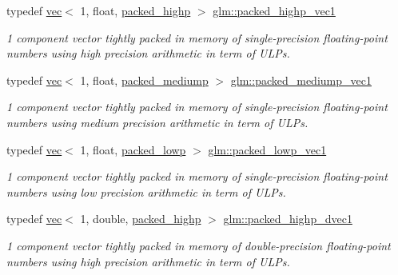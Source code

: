 \begin{DoxyCompactItemize}
typedef \hyperlink{structglm_1_1vec}{vec}$<$ 1, float, \hyperlink{namespaceglm_a36ed105b07c7746804d7fdc7cc90ff25a8e8791ee77fe079b1291f710d88031bf}{packed\+\_\+highp} $>$ \hyperlink{group__gtc__type__aligned_ga0356e10a8b10f699cf7cf4308f449c83}{glm\+::packed\+\_\+highp\+\_\+vec1}
\begin{DoxyCompactList}\small\item\em 1 component vector tightly packed in memory of single-\/precision floating-\/point numbers using high precision arithmetic in term of U\+L\+Ps. \end{DoxyCompactList}\item 
typedef \hyperlink{structglm_1_1vec}{vec}$<$ 1, float, \hyperlink{namespaceglm_a36ed105b07c7746804d7fdc7cc90ff25a9604654c3b137cd7898689fd34b25bc0}{packed\+\_\+mediump} $>$ \hyperlink{group__gtc__type__aligned_gadf62fccc1514b0dca7ab1067263fca4c}{glm\+::packed\+\_\+mediump\+\_\+vec1}
\begin{DoxyCompactList}\small\item\em 1 component vector tightly packed in memory of single-\/precision floating-\/point numbers using medium precision arithmetic in term of U\+L\+Ps. \end{DoxyCompactList}\item 
typedef \hyperlink{structglm_1_1vec}{vec}$<$ 1, float, \hyperlink{namespaceglm_a36ed105b07c7746804d7fdc7cc90ff25ac36a4bd74559be2c0b65bc48e5953b8b}{packed\+\_\+lowp} $>$ \hyperlink{group__gtc__type__aligned_ga23472ebc3f98baab2a17053bc3788a9c}{glm\+::packed\+\_\+lowp\+\_\+vec1}
\begin{DoxyCompactList}\small\item\em 1 component vector tightly packed in memory of single-\/precision floating-\/point numbers using low precision arithmetic in term of U\+L\+Ps. \end{DoxyCompactList}\item 
typedef \hyperlink{structglm_1_1vec}{vec}$<$ 1, double, \hyperlink{namespaceglm_a36ed105b07c7746804d7fdc7cc90ff25a8e8791ee77fe079b1291f710d88031bf}{packed\+\_\+highp} $>$ \hyperlink{group__gtc__type__aligned_ga28333ae58dc1ce6fdf75a8dba0065603}{glm\+::packed\+\_\+highp\+\_\+dvec1}
\begin{DoxyCompactList}\small\item\em 1 component vector tightly packed in memory of double-\/precision floating-\/point numbers using high precision arithmetic in term of U\+L\+Ps. \end{DoxyCompactList}\item 

\end{DoxyCompactItemize}
